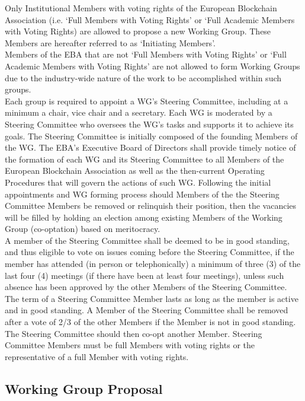 \documentclass{article}
\begin{document}
Only Institutional Members with voting rights of the European Blockchain Association (i.e. ‘Full Members with Voting Rights’ or ‘Full Academic Members with Voting Rights) are allowed to propose a new Working Group. These Members are hereafter referred to as ‘Initiating Members’. \\
Members of the EBA that are not ‘Full Members with Voting Rights’ or ‘Full Academic Members with Voting Rights’ are not allowed to form Working Groups due to the industry-wide nature of the work to be accomplished within such groups. \\ 
Each group is required to appoint a WG’s Steering Committee, including at a minimum a chair, vice chair and a secretary.
 Each WG is moderated by a Steering Committee who oversees the WG’s tasks and supports it to achieve its goals. 
 The Steering Committee is initially composed of the founding Members of the WG. 
 The EBA’s Executive Board of Directors shall provide timely notice of the formation of each WG and its Steering Committee to all Members of the European Blockchain Association as well as the then-current Operating Procedures that will govern the actions of such WG. 
 Following the initial appointments and WG forming process should Members of the the Steering Committee Members be removed or relinquish their position, then the vacancies will be filled by holding an election among existing Members of the Working Group (co-optation) based on meritocracy. \\
A member of the Steering Committee shall be deemed to be in good standing, and thus eligible to vote on issues coming before the Steering Committee, if the member has attended (in person or telephonically) a minimum of three (3) of the last four (4) meetings (if there have been at least four meetings), unless such absence has been approved by the other Members of the Steering Committee. The term of a Steering Committee Member lasts as long as the member is active and in good standing. 
A Member of the Steering Committee shall be removed after a vote of 2/3 of the other Members if the Member is not in good standing. The Steering Committee should then co-opt another Member. 
Steering Committee Members must be full Members with voting rights or the representative of a full Member with voting rights.

\subsection{Working Group Proposal}
\end{document}
